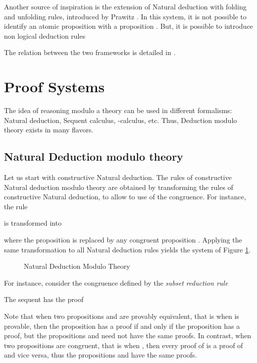 \documentclass{llncs}
\begin{document}
Another source of inspiration is the extension of 
Natural deduction with folding and unfolding rules, introduced by Prawitz
\cite{Prawitz,Crabbe74,Hallnas,Ekman,Crabbe91}.
In this system, it is not possible to identify an atomic proposition 
with a proposition . But, it is possible to introduce non logical 
deduction rules 
 
The relation between the two frameworks is detailed in 
\cite{foldunfold}. 


\section{Proof Systems}

The idea of reasoning modulo a theory can be used in different
formalisms: Natural deduction, Sequent calculus, -calculus, etc.
Thus, Deduction modulo theory exists in many flavors. 

\subsection{Natural Deduction modulo theory}

Let us start with constructive Natural deduction.  The rules of
constructive Natural deduction modulo theory are obtained by
transforming the rules of constructive Natural deduction, to allow to
use of the congruence. For instance, the rule

is transformed into 

where the proposition  is replaced by any congruent 
proposition . 
Applying the same transformation to all Natural deduction rules yields
the system of Figure \ref{ndm}.

\begin{figure}

\caption{Natural Deduction Modulo Theory\label{ndm}}
\end{figure}

For instance, consider the congruence defined by the {\em subset reduction rule}

The sequent  has the proof


Note that when two propositions  and  are provably
equivalent, that is when  is provable,
then the proposition  has a proof if and only if the
proposition  has a proof, but the propositions  and 
need not have the same proofs.  In contrast, when two
propositions are congruent, that is when , then
every proof of  is a proof of  and vice versa, thus the
propositions  and  have the same proofs.
\end{document}
